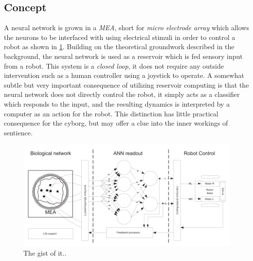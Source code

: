 \subsection{Concept}
A neural network is grown in a \textit{MEA}, short for \textit{micro electrode
 array} which allows the neurons to be interfaced with using electrical stimuli
in order to control a robot as shown in \ref{fig:cyborg_idea}.
Building on the theoretical groundwork described in the background, the neural
network is used as a reservoir which is fed sensory input from a robot.
This system is a \textit{closed loop}, it does not require any outside
intervention such as a human controller using a joystick to operate.
A somewhat subtle but very important consequence of utilizing reservoir
computing is that the neural network does not directly control the robot, it
simply acts as a classifier which responds to the input, and the resulting
dynamics is interpreted by a computer as an action for the robot.
This distinction has little practical consequence for the cyborg, but may offer
a clue into the inner workings of sentience.
\begin{figure}[h!]
    \includegraphics[width=\linewidth]{images/cyborg_overview.png}
    \caption{The gist of it..}
    \label{fig:cyborg_idea}
\end{figure}
